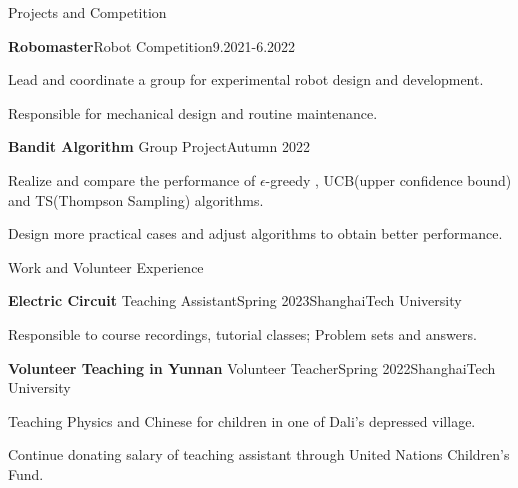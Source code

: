 \documentclass[]{ZhongtaoGuan-resume}
\begin{document}
\begin{section}{Projects and Competition}
 \begin{subsection}{\textbf{Robomaster}}{Robot Competition}{9.2021-6.2022}{}
     \item{Lead and coordinate a group for experimental robot design and development.}
     \item{Responsible for mechanical design and routine maintenance.}

 \end{subsection}

 \begin{subsection}{\textbf{Bandit Algorithm}}
     {Group Project}{Autumn 2022}{}
     \item{Realize and compare the performance of $\epsilon$-greedy , UCB(upper confidence bound) and TS(Thompson Sampling) algorithms.}
     \item{ Design more practical cases and adjust algorithms to obtain better performance.}
 \end{subsection}
\end{section}


\begin{section}{Work and Volunteer Experience}
 \begin{subsection}{\textbf{Electric Circuit}}
     {Teaching Assistant}{Spring 2023}{ShanghaiTech University}
     \item{Responsible to course recordings, tutorial classes; Problem sets and answers.}
 \end{subsection}
 \begin{subsection}{\textbf{Volunteer Teaching in Yunnan}}
     {Volunteer Teacher}{Spring 2022}{ShanghaiTech University}
     \item{Teaching Physics and Chinese for children in one of Dali's depressed village.}
     \item{Continue donating salary of teaching assistant through United Nations Children's Fund.}
 \end{subsection}
\end{section}

\end{document}
